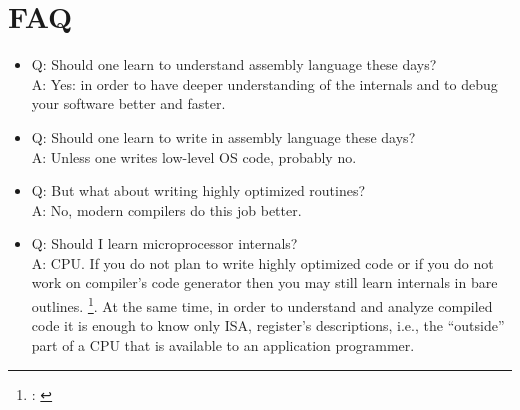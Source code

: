 \section{\ac{FAQ}}

\newcommand{\FNURLREDDIT}{\footnote{\url{http://www.reddit.com/r/ReverseEngineering/}}}

\begin{itemize}
\item
Q: 
{Should one learn to understand assembly language these days?} \\
A: 
{Yes: in order to have deeper understanding of the internals and to debug your software better and faster.}

\item
Q: 
{Should one learn to write in assembly language these days?} \\
A: 
{Unless one writes low-level \ac{OS} code, probably no.}

\item
Q: 
{But what about writing highly optimized routines?} \\
A: 
{No, modern \CCpp compilers do this job better.}

\item
Q: 
{Should I learn microprocessor internals}? \\
A:  \ac{CPU}.
{If you do not plan to write highly optimized code or if you do not work on compiler's code generator
then you may still learn internals in bare outlines.}
\footnote{: \cite{AgnerFog}}.
{At the same time, in order to understand and analyze compiled code it is enough to know
only \ac{ISA}, register's descriptions, i.e., the ``outside'' part of a \ac{CPU} that is available to
an application programmer}.


\end{itemize}

